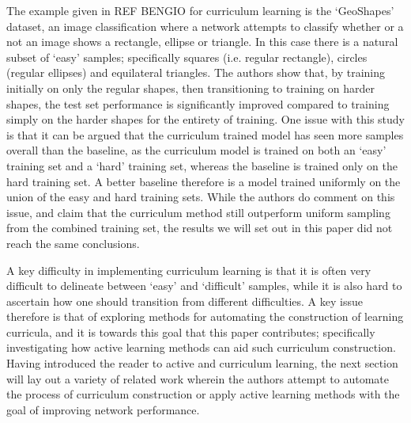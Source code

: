 The example given in REF BENGIO  for curriculum learning is the `GeoShapes' dataset, an image classification where a network attempts to classify whether or a not an image shows a rectangle, ellipse or triangle. In this case there is a natural subset of `easy' samples; specifically squares (i.e. regular rectangle), circles (regular ellipses) and equilateral triangles. The authors show that, by training initially on only the regular shapes, then transitioning to training on harder shapes, the test set performance is significantly improved compared to training simply on the harder shapes for the entirety of training. One issue with this study is that it can be argued that the curriculum trained model has seen more samples overall than the baseline, as the curriculum model is trained on both an `easy' training set and a `hard' training set, whereas the baseline is trained only on the hard training set. A better baseline therefore is a model trained uniformly on the union of the easy and hard training sets. While the authors do comment on this issue, and claim that the curriculum method still outperform uniform sampling from the combined training set, the results we will set out in this paper did not reach the same conclusions. 

A key difficulty in implementing curriculum learning is that it is often very difficult to delineate between `easy' and `difficult' samples, while it is also hard to ascertain how one should transition from different difficulties. A key issue therefore is that of exploring methods for  automating the construction of learning curricula, and it is towards this goal that this paper contributes; specifically investigating how active learning methods can aid such curriculum construction. Having introduced the reader to active and curriculum learning, the next section will lay out a variety of related work wherein the authors attempt to automate the process of curriculum construction or apply active learning methods with the goal of improving network performance. 


